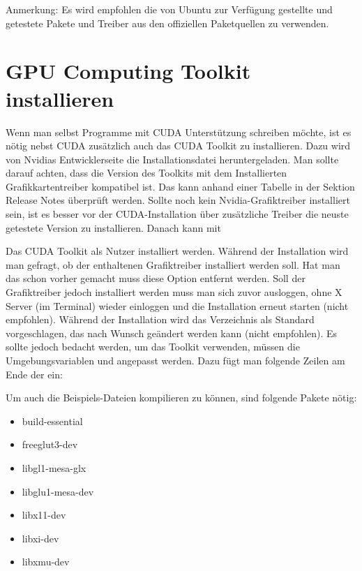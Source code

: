 Anmerkung: Es wird empfohlen die von Ubuntu zur Verfügung gestellte und getestete Pakete und Treiber aus den offiziellen Paketquellen zu verwenden. 

\section{GPU Computing Toolkit installieren}

Wenn man selbst Programme mit CUDA Unterstützung schreiben möchte, ist es nötig nebst CUDA zusätzlich auch das CUDA Toolkit zu installieren. Dazu wird von Nvidias Entwicklerseite die Installationsdatei heruntergeladen. Man sollte darauf achten, dass die Version des Toolkits mit dem Installierten Grafikkartentreiber kompatibel ist. Das kann anhand einer Tabelle in der Sektion Release Notes überprüft werden. Sollte noch kein Nvidia-Grafiktreiber installiert sein, ist es besser vor der CUDA-Installation über zusätzliche Treiber die neuste getestete Version zu installieren. Danach kann mit 


\medskip


	
\medskip

Das CUDA Toolkit als Nutzer installiert werden. Während der Installation wird man gefragt, ob der enthaltenen Grafiktreiber installiert werden soll. Hat man das schon vorher gemacht muss diese Option entfernt werden. Soll der Grafiktreiber jedoch installiert werden muss man sich zuvor ausloggen, ohne X Server (im Terminal) wieder einloggen und die Installation erneut starten (nicht empfohlen). Während der Installation wird das Verzeichnis  als Standard vorgeschlagen, das nach Wunsch geändert werden kann (nicht empfohlen). Es sollte jedoch bedacht werden, um das Toolkit verwenden, müssen die Umgebungsvariablen  und  angepasst werden. Dazu fügt man folgende Zeilen am Ende der  ein: 

\medskip



\medskip



Um auch die Beispiels-Dateien kompilieren zu können, sind folgende Pakete nötig: 

\begin{itemize}
  \item build-essential
  \item freeglut3-dev
  \item libgl1-mesa-glx
  \item libglu1-mesa-dev
  \item libx11-dev
  \item libxi-dev
  \item libxmu-dev
\end{itemize}

